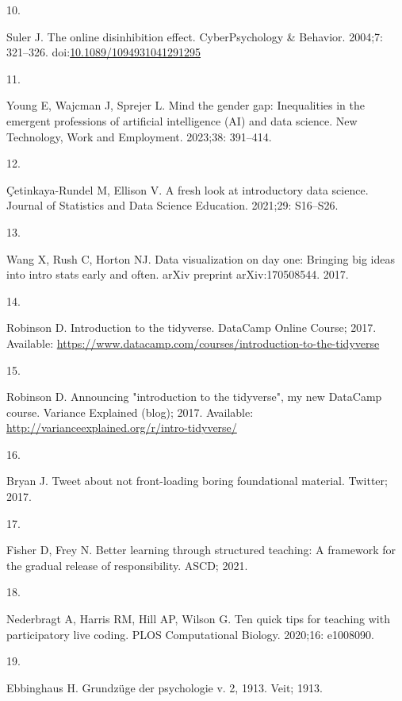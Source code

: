 \documentclass[
  10pt,
  letterpaper,
]{article}
\newlength{\cslhangindent}
\newlength{\csllabelwidth}
\newenvironment{CSLReferences}[2] %
 {\begin{list}{}{%
  \setlength{\itemindent}{0pt}
  \setlength{\leftmargin}{0pt}
  \setlength{\parsep}{0pt}
  \ifodd #1
   \setlength{\leftmargin}{\cslhangindent}
   \setlength{\itemindent}{-1\cslhangindent}
  \fi
  \setlength{\itemsep}{#2\baselineskip}}}
 {\end{list}}
\newcommand{\CSLLeftMargin}[1]{\parbox[t]{\csllabelwidth}{\strut#1\strut}}
\newcommand{\CSLRightInline}[1]{\parbox[t]{\linewidth - \csllabelwidth}{\strut#1\strut}}
\begin{document}
\begin{CSLReferences}{0}{1}
\CSLLeftMargin{10. }%
\CSLRightInline{Suler J. The online disinhibition effect.
CyberPsychology \& Behavior. 2004;7: 321--326.
doi:\href{https://doi.org/10.1089/1094931041291295}{10.1089/1094931041291295}}

\CSLLeftMargin{11. }%
\CSLRightInline{Young E, Wajcman J, Sprejer L. Mind the gender gap:
Inequalities in the emergent professions of artificial intelligence (AI)
and data science. New Technology, Work and Employment. 2023;38:
391--414. }

\CSLLeftMargin{12. }%
\CSLRightInline{Çetinkaya-Rundel M, Ellison V. A fresh look at
introductory data science. Journal of Statistics and Data Science
Education. 2021;29: S16--S26. }

\CSLLeftMargin{13. }%
\CSLRightInline{Wang X, Rush C, Horton NJ. Data visualization on day
one: Bringing big ideas into intro stats early and often. arXiv preprint
arXiv:170508544. 2017. }

\CSLLeftMargin{14. }%
\CSLRightInline{Robinson D. Introduction to the tidyverse. DataCamp
Online Course; 2017. Available:
\url{https://www.datacamp.com/courses/introduction-to-the-tidyverse}}

\CSLLeftMargin{15. }%
\CSLRightInline{Robinson D. Announcing "introduction to the tidyverse",
my new DataCamp course. Variance Explained (blog); 2017. Available:
\url{http://varianceexplained.org/r/intro-tidyverse/}}

\CSLLeftMargin{16. }%
\CSLRightInline{Bryan J. Tweet about not front-loading boring
foundational material. Twitter; 2017. }

\CSLLeftMargin{17. }%
\CSLRightInline{Fisher D, Frey N. Better learning through structured
teaching: A framework for the gradual release of responsibility. ASCD;
2021. }

\CSLLeftMargin{18. }%
\CSLRightInline{Nederbragt A, Harris RM, Hill AP, Wilson G. Ten quick
tips for teaching with participatory live coding. PLOS Computational
Biology. 2020;16: e1008090. }

\CSLLeftMargin{19. }%
\CSLRightInline{Ebbinghaus H. Grundzüge der psychologie v. 2, 1913.
Veit; 1913. }


\end{CSLReferences}
\end{document}
